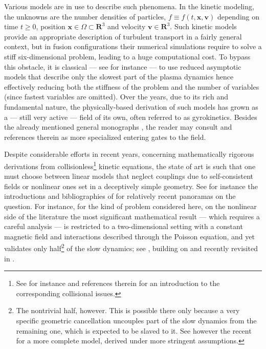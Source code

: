 \documentclass[10pt]{amsart}
\theoremstyle{plain}
\theoremstyle{definition}
\newcommand\R{\mathbf R}
\newcommand\bfv{{\boldsymbol v}}
\newcommand\bfx{{\boldsymbol x}}
\begin{document}
Various models are in use to describe such phenomena. In the kinetic modeling, the unknowns are the number densities of particles, $f\equiv f(t,\bfx,\bfv)$ depending on time $t\geq 0$, position $\bfx\in\Omega\subset \R^3$ and velocity $\bfv\in\R^3$. Such kinetic models provide an appropriate description of turbulent transport in a fairly general context, but in fusion configurations their numerical simulations require to solve a stiff six-dimensional problem, leading to a huge computational cost. To bypass this obstacle, it is classical --- see for instance \cite{Garbet-et-al_2010} --- to use reduced asymptotic models that describe only the slowest part of the plasma dynamics hence effectively reducing both the stiffness of the problem and the number of variables (since fastest variables are omitted). Over the years, due to its rich and fundamental nature, the physically-based derivation of such models has grown as a --- still very active --- field of its own, often referred to as gyrokinetics. Besides the already mentioned general monographs \cite{bellan_2006_fundamentals,chen_introduction,freidberg2008plasma,haz_mei_03,miyamoto_2006_plasma, piel2010plasma}, the reader may consult \cite{Krommes,bri_hahm_07,Matteo-PhD,Scott_gyrokinetic,PDFF} and references therein as more specialized entering gates to the field.

Despite considerable efforts in recent years, concerning mathematically rigorous derivations from collisionless\footnote{See for instance \cite{herda_2016_massless,herda_2016_anisotropic} and references therein for an introduction to the corresponding collisional issues.} kinetic equations, the state of art is such that one must choose between linear models that neglect couplings due to self-consistent fields or nonlinear ones set in a deceptively simple geometry. See for instance the introductions and bibliographies of \cite{HanKwan_PhD,Lutz_PhD,Herda_PhD} for relatively recent panoramas on the question. For instance, for the kind of problem considered here, on the nonlinear side of the literature the most significant mathematical result --- which requires a careful analysis --- is restricted to a two-dimensional setting with a constant magnetic field and interactions described through the Poisson equation, and yet validates only half\footnote{The nontrivial half, however. This is possible there only because a very specific geometric cancellation uncouples part of the slow dynamics from the remaining one, which is expected to be slaved to it. See however the recent \cite{Bostan_2D-VP} for a more complete model, derived under more stringent assumptions.} of the slow dynamics; see \cite{laure0}, building on \cite{gol_lsr_99} and recently revisited in \cite{Miot-2D-gyrokinetic}.
\end{document}
